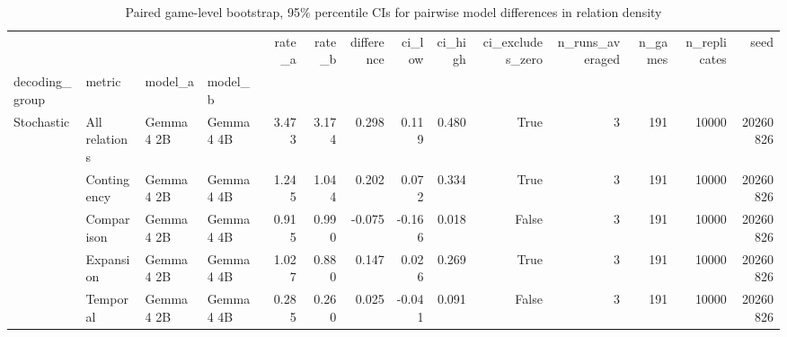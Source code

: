 \begin{table}
\caption{Paired game-level bootstrap, 95\% percentile CIs for pairwise model differences in relation density}
\begin{tabular}{llllrrrrrrrrrr}
\toprule
 &  &  &  & rate\_a & rate\_b & difference & ci\_low & ci\_high & ci\_excludes\_zero & n\_runs\_averaged & n\_games & n\_replicates & seed \\
decoding_group & metric & model_a & model_b &  &  &  &  &  &  &  &  &  &  \\
\midrule
\multirow[t]{5}{*}{Stochastic} & All relations & Gemma 4 2B & Gemma 4 4B & 3.473 & 3.174 & 0.298 & 0.119 & 0.480 & True & 3 & 191 & 10000 & 20260826 \\
\cline{2-14} \cline{3-14}
 & Contingency & Gemma 4 2B & Gemma 4 4B & 1.245 & 1.044 & 0.202 & 0.072 & 0.334 & True & 3 & 191 & 10000 & 20260826 \\
\cline{2-14} \cline{3-14}
 & Comparison & Gemma 4 2B & Gemma 4 4B & 0.915 & 0.990 & -0.075 & -0.166 & 0.018 & False & 3 & 191 & 10000 & 20260826 \\
\cline{2-14} \cline{3-14}
 & Expansion & Gemma 4 2B & Gemma 4 4B & 1.027 & 0.880 & 0.147 & 0.026 & 0.269 & True & 3 & 191 & 10000 & 20260826 \\
\cline{2-14} \cline{3-14}
 & Temporal & Gemma 4 2B & Gemma 4 4B & 0.285 & 0.260 & 0.025 & -0.041 & 0.091 & False & 3 & 191 & 10000 & 20260826 \\
\cline{1-14} \cline{2-14} \cline{3-14}
\bottomrule
\end{tabular}
\end{table}

